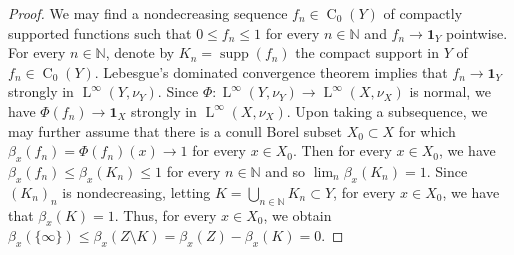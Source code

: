 \documentclass[10pt,a4paper]{amsart}
\newcommand{\N}{\mathbb{N}}
\newcommand{\rC}{\operatorname{C}}
\newcommand{\rL}{\operatorname{ L}}
\newcommand{\supp}{\operatorname{supp}}
\begin{document}
\begin{proof}
We may find a nondecreasing sequence $f_n \in \rC_0(Y)$ of compactly supported functions such that $0 \leq f_n \leq 1$ for every $n \in \N$ and $f_n \to \mathbf 1_Y$ pointwise. For every $n \in \N$, denote by $K_n = \supp(f_n)$ the compact support in $Y$ of $f_n \in \rC_0(Y)$. Lebesgue's dominated convergence theorem implies that $f_n \to \mathbf 1_Y$ strongly in $\rL^\infty(Y, \nu_Y)$. Since $\Phi : \rL^\infty(Y, \nu_Y) \to \rL^\infty(X, \nu_X)$ is normal, we have $\Phi(f_n) \to \mathbf 1_X$ strongly in $\rL^\infty(X, \nu_X)$. Upon taking a subsequence, we may further assume that there is a conull Borel subset $X_0 \subset X$ for which $\beta_x(f_n) = \Phi(f_n)(x) \to 1$ for every $x \in X_0$. Then for every $x \in X_0$, we have $\beta_x(f_n) \leq \beta_x(K_n) \leq 1$ for every $n \in \N$ and so $\lim_n \beta_x(K_n) = 1$. Since $(K_n)_n$ is nondecreasing, letting $K = \bigcup_{n \in \N} K_n \subset Y$, for every $x \in X_0$, we have that $\beta_x(K) = 1$. Thus, for every $x \in X_0$, we obtain $\beta_x(\{\infty\}) \leq \beta_x(Z \setminus K) = \beta_x(Z) - \beta_x(K) = 0$.
\end{proof}
\end{document}
